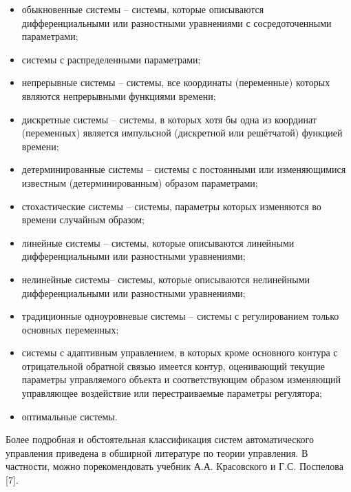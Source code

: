 \begin{itemize}
	\item 
			обыкновенные системы – системы, которые описываются дифференциальными или разностными уравнениями с сосредоточенными
			параметрами;
	
	\item 
			системы с распределенными параметрами;
	
	\item 
			непрерывные системы – системы, все координаты (переменные) которых являются непрерывными функциями времени;
	
	\item 
			дискретные системы – системы, в которых хотя бы одна из координат (переменных) является импульсной (дискретной или
			решётчатой) функцией времени;
	
	\item 
			детерминированные системы – системы с постоянными или изменяющимися известным (детерминированным) образом параметрами;
	
	\item 
			стохастические системы – системы, параметры которых изменяются во времени случайным образом;
	
	\item 
			линейные системы – системы, которые описываются линейными дифференциальными или разностными уравнениями;
	
	\item 
			нелинейные системы– системы, которые описываются нелинейными дифференциальными или разностными уравнениями;
	
	\item 
			традиционные одноуровневые системы – системы с регулированием только основных переменных;
	
	\item 
			системы с адаптивным управлением, в которых кроме основного контура с отрицательной обратной связью имеется контур,
			оценивающий текущие параметры управляемого объекта и соответствующим образом изменяющий управляющее воздействие или
			перестраиваемые параметры регулятора;
	
	\item 
			оптимальные системы.
	
\end{itemize}

\bigskip


		Более подробная и обстоятельная классификация систем автоматического управления приведена в обширной литературе по
		теории управления. В частности, можно порекомендовать учебник А.А. Красовского и Г.С. Поспелова [7]. 
